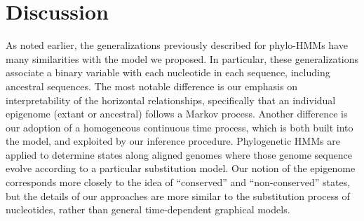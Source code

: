 \documentclass[11pt]{article}
\begin{document}
\section{Discussion}

As noted earlier, the generalizations previously described for
phylo-HMMs have many similarities with the model we proposed. In
particular, these generalizations associate a binary variable with
each nucleotide in each sequence, including ancestral sequences.  The
most notable difference is our emphasis on interpretability of the
horizontal relationships, specifically that an individual epigenome
(extant or ancestral) follows a Markov process. Another difference is
our adoption of a homogeneous continuous time process, which is both
built into the model, and exploited by our inference
procedure. Phylogenetic HMMs are applied to determine states along
aligned genomes where those genome sequence evolve according to a
particular substitution model. Our notion of the epigenome corresponds
more closely to the idea of ``conserved'' and ``non-conserved''
states, but the details of our approaches are more similar to the
substitution process of nucleotides, rather than general
time-dependent graphical models.

\clearpage



\end{document}
